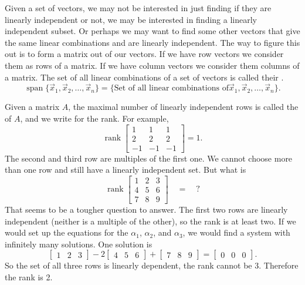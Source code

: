 Given a set of vectors, we may not be interested in just finding if they
are linearly independent or not, we may be interested in finding a linearly
independent subset.  Or perhaps we may want to find some other vectors that
give the same linear combinations and are linearly independent.
The way to figure this out is to form a matrix out of our vectors.  If we
have row vectors we consider them as rows of a matrix.  If we have
column vectors we consider them columns of a matrix.
The set of all linear combinations of a set of vectors is called their
\emph{}.
\begin{equation*}
\operatorname{span} \bigl\{ \vec{x}_1, \vec{x}_2 , \ldots , \vec{x}_n \bigr\}
=
\bigl\{
\text{Set of all linear combinations of
$\vec{x}_1, \vec{x}_2 , \ldots , \vec{x}_n$}
\bigr\} .
\end{equation*}


Given a matrix $A$, the maximal number of linearly independent rows is called
the \emph{} of $A$, and we write
 for the rank.
For example,
\begin{equation*}
\operatorname{rank}
\begin{bmatrix}
1 & 1 & 1 \\
2 & 2 & 2 \\
-1 & -1 & -1
\end{bmatrix}
=
1 .
\end{equation*}
The second and third
row are multiples of the first one.  We cannot choose more than one row and
still have a linearly independent set.   But what is
\begin{equation*}
\operatorname{rank}
\begin{bmatrix}
1 & 2 & 3 \\
4 & 5 & 6 \\
7 & 8 & 9
\end{bmatrix} \quad = \quad ?
\end{equation*}
That seems to be a tougher question to answer.  The
first two rows are linearly independent (neither is a multiple of the other),
so the rank is at least
two.  If we would set up the equations for the $\alpha_1$, $\alpha_2$, and
$\alpha_3$, we would find a system with infinitely many solutions.  One
solution is
\begin{equation*}
\begin{bmatrix}
1 & 2 & 3
\end{bmatrix} -2
\begin{bmatrix}
4 & 5 & 6 
\end{bmatrix} +
\begin{bmatrix}
7 & 8 & 9
\end{bmatrix} =
\begin{bmatrix}
0 & 0 & 0
\end{bmatrix} .
\end{equation*}
So the set of all three rows is linearly dependent, the rank cannot be
3.  Therefore the rank is 2.

